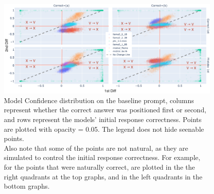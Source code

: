 \begin{figure}[ht!]
  \includegraphics[width=\textwidth]{img/first_vs_last_logit_diff_on_baseline.png}
  \caption{Model Confidence distribution on the baseline prompt, columns represent whether the correct answer was positioned first or second, and rows represent the models' initial response correctness. Points are plotted with opacity = 0.05. The legend does not hide seenable points. \\
  Also note that some of the points are not natural, as they are simulated to control the initial response correctness. For example, for the points that were naturally correct, are plotted in the the right quadrants at the top graphs, and in the left quadrants in the bottom graphs.}
  \label{fig:models_confidence}
\end{figure}
